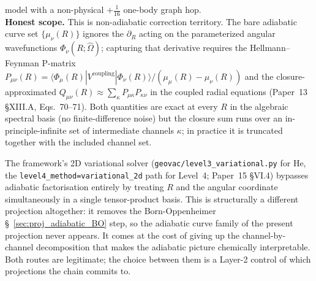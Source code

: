 \documentclass[11pt]{article}
\begin{document}
model with a non-physical $+\tfrac{1}{16}$ one-body graph hop.\\
\textbf{Honest scope.}  This is non-adiabatic correction territory.
The bare adiabatic curve set $\{\mu_\nu(R)\}$ ignores the
$\partial_R$ acting on the parameterized angular wavefunctions
$\Phi_\nu(R; \hat{\Omega})$; capturing that derivative requires the
Hellmann--Feynman P-matrix $P_{\mu\nu}(R) = \langle \Phi_\mu(R) |
V^\text{coupling} | \Phi_\nu(R) \rangle / (\mu_\mu(R) - \mu_\nu(R))$
and the closure-approximated $Q_{\mu\nu}(R) \approx \sum_\kappa
P_{\mu\kappa} P_{\kappa\nu}$ in the coupled radial equations (Paper~13
§XIII.A, Eqs.~70--71).  Both quantities are exact at every $R$ in the
algebraic spectral basis (no finite-difference noise) but the closure
sum runs over an in-principle-infinite set of intermediate channels
$\kappa$; in practice it is truncated together with the included
channel set.

The framework's 2D variational solver
(\texttt{geovac/level3\_variational.py} for He, the
\texttt{level4\_method=\textquotesingle variational\_2d\textquotesingle}
path for Level~4; Paper~15 §VI.4) bypasses adiabatic factorisation
entirely by treating $R$ and the angular coordinate simultaneously in
a single tensor-product basis.  This is structurally a different
projection altogether: it removes the Born-Oppenheimer
\S~\ref{sec:proj_adiabatic_BO} step, so the adiabatic curve
family of the present projection never appears.  It comes at the cost
of giving up the channel-by-channel decomposition that makes the
adiabatic picture chemically interpretable.  Both routes are
legitimate; the choice between them is a Layer-2 control of which
projections the chain commits to.
\end{document}
